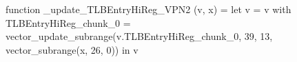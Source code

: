 function _update_TLBEntryHiReg_VPN2 (v, x) = let v = { v with TLBEntryHiReg_chunk_0 = vector_update_subrange(v.TLBEntryHiReg_chunk_0, 39, 13, vector_subrange(x, 26, 0)) } in v
